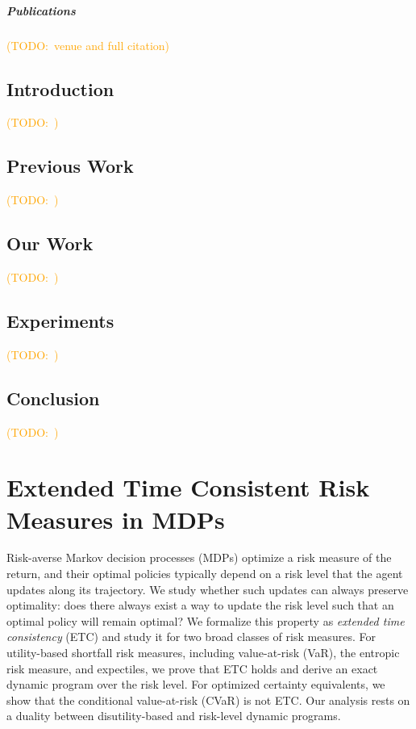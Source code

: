 \documentclass[12pt,letterpaper,oneside]{report}
\theoremstyle{plain}
\theoremstyle{definition}
\theoremstyle{remark}
\newcommand{\todo}[1]{\textcolor{orange}{(TODO:\ #1)}}
\begin{document}
\paragraph{Publications} \todo{venue and full citation}

\section{Introduction}\label{sec:fast-risk-intro}

\todo{}

\section{Previous Work}\label{sec:fast-risk-prior}

\todo{}

\section{Our Work}\label{sec:fast-risk-ours}

\todo{}

\section{Experiments}\label{sec:fast-risk-experiments}

\todo{}

\section{Conclusion}\label{sec:fast-risk-conclusion}

\todo{}

\chapter{Extended Time Consistent Risk Measures in MDPs}\label{ch:etc}

Risk-averse Markov decision processes (MDPs) optimize a risk measure of the return, and their optimal policies typically depend on a risk level that the agent updates along its trajectory. We study whether such updates can always preserve optimality: does there always exist a way to update the risk level such that an optimal policy will remain optimal? We formalize this property as \emph{extended time consistency} (ETC) and study it for two broad classes of risk measures. For utility-based shortfall risk measures, including value-at-risk (VaR), the entropic risk measure, and expectiles, we prove that ETC holds and derive an exact dynamic program over the risk level. For optimized certainty equivalents, we show that the conditional value-at-risk (CVaR) is not ETC. Our analysis rests on a duality between disutility-based and risk-level dynamic programs.
\end{document}
